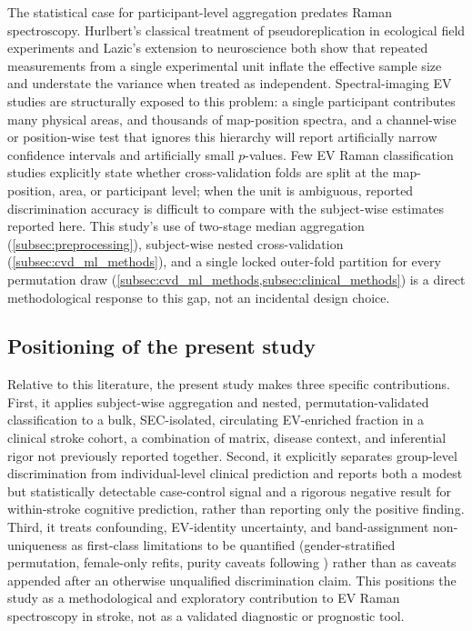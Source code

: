 \documentclass[preprint,12pt]{elsarticle}
\begin{document}
The statistical case for participant-level aggregation predates Raman spectroscopy. Hurlbert's classical treatment of pseudoreplication in ecological field experiments \cite{hurlbert1984} and Lazic's extension to neuroscience \cite{lazic2010} both show that repeated measurements from a single experimental unit inflate the effective sample size and understate the variance when treated as independent. Spectral-imaging EV studies are structurally exposed to this problem: a single participant contributes many physical areas, and thousands of map-position spectra, and a channel-wise or position-wise test that ignores this hierarchy will report artificially narrow confidence intervals and artificially small $p$-values. Few EV Raman classification studies explicitly state whether cross-validation folds are split at the map-position, area, or participant level; when the unit is ambiguous, reported discrimination accuracy is difficult to compare with the subject-wise estimates reported here. This study's use of two-stage median aggregation (\cref{subsec:preprocessing}), subject-wise nested cross-validation (\cref{subsec:cvd_ml_methods}), and a single locked outer-fold partition for every permutation draw (\cref{subsec:cvd_ml_methods,subsec:clinical_methods}) is a direct methodological response to this gap, not an incidental design choice.

\subsection{Positioning of the present study} 
\label{subsec:related_positioning}

Relative to this literature, the present study makes three specific contributions. First, it applies subject-wise aggregation and nested, permutation-validated classification to a bulk, SEC-isolated, circulating EV-enriched fraction in a clinical stroke cohort, a combination of matrix, disease context, and inferential rigor not previously reported together. Second, it explicitly separates group-level discrimination from individual-level clinical prediction and reports both a modest but statistically detectable case-control signal and a rigorous negative result for within-stroke cognitive prediction, rather than reporting only the positive finding. Third, it treats confounding, EV-identity uncertainty, and band-assignment non-uniqueness as first-class limitations to be quantified (gender-stratified permutation, female-only refits, purity caveats following \cite{gualerzi2019,koster2021}) rather than as caveats appended after an otherwise unqualified discrimination claim. This positions the study as a methodological and exploratory contribution to EV Raman spectroscopy in stroke, not as a validated diagnostic or prognostic tool.
\color{black}
\end{document}
